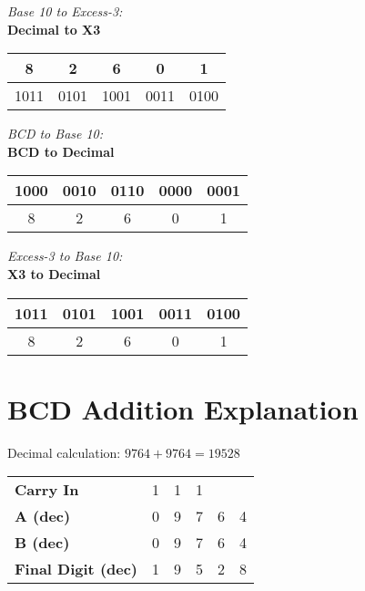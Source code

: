       \textit{Base 10 to Excess-3:} \\[6pt]
    
    \textbf{Decimal to X3} \\

    \begin{tabular}{|c|c|c|c|c|}
    \hline
 8  &  2  &  6  &  0  &  1  \\
    \hline
 1011  &  0101  &  1001  &  0011  &  0100  \\
    \hline
    \end{tabular}




      \textit{BCD to Base 10:} \\[6pt]
    
    \textbf{ BCD to Decimal} \\

    \begin{tabular}{|c|c|c|c|c|}
    \hline
 1000  &  0010  &  0110  &  0000  &  0001  \\
    \hline
 8  &  2  &  6  &  0  &  1  \\
    \hline
    \end{tabular}



      \textit{Excess-3 to Base 10:} \\[6pt]
        
    \textbf{ X3 to Decimal} \\

    \begin{tabular}{|c|c|c|c|c|}
    \hline
 1011  &  0101  &  1001  &  0011  &  0100  \\
    \hline
 8  &  2  &  6  &  0  &  1  \\
    \hline
    \end{tabular}




  
\section*{ BCD Addition Explanation }

Decimal calculation: $9764 + 9764 = 19528$

\vspace{0.3cm}

\begin{tabular}{l|rrrrr}
\textbf{Carry In} &  {\scriptsize 1}  &  {\scriptsize 1}  &  {\scriptsize 1}  &  {\scriptsize }  &  {\scriptsize }  \\
\textbf{A (dec)} &  0  &  9  &  7  &  6  &  4  \\
\textbf{B (dec)} &  0  &  9  &  7  &  6  &  4  \\
\hline
\textbf{Final Digit (dec)} &  1  &  9  &  5  &  2  &  8  \\
\end{tabular}

